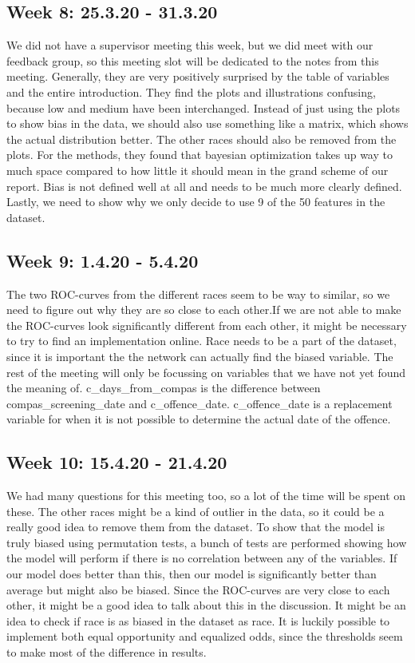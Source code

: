 \documentclass[11pt, fleqn]{article}
\begin{document}
\subsection*{Week 8: 25.3.20 - 31.3.20}
We did not have a supervisor meeting this week, but we did meet with our feedback group, so this meeting slot will be dedicated to the notes from this meeting. Generally, they are very positively surprised by the table of variables and the entire introduction. They find the plots and illustrations confusing, because low and medium have been interchanged. Instead of just using the plots to show bias in the data, we should also use something like a matrix, which shows the actual distribution better. The other races should also be removed from the plots. For the methods, they found that bayesian optimization takes up way to much space compared to how little it should mean in the grand scheme of our report. Bias is not defined well at all and needs to be much more clearly defined. Lastly, we need to show why we only decide to use 9 of the 50 features in the dataset.

\subsection*{Week 9: 1.4.20 - 5.4.20}
The two ROC-curves from the different races seem to be way to similar, so we need to figure out why they are so close to each other.If we are not able to make the ROC-curves look significantly different from each other, it might be necessary to try to find an implementation online. Race needs to be a part of the dataset, since it is important the the network can actually find the biased variable. The rest of the meeting will only be focussing on variables that we have not yet found the meaning of. c\_days\_from\_compas is the difference between compas\_screening\_date and c\_offence\_date. c\_offence\_date is a replacement variable for when it is not possible to determine the actual date of the offence.

\subsection*{Week 10: 15.4.20 - 21.4.20}
We had many questions for this meeting too, so a lot of the time will be spent on these. The other races might be a kind of outlier in the data, so it could be a really good idea to remove them from the dataset. To show that the model is truly biased using permutation tests, a bunch of tests are performed showing how the model will perform if there is no correlation between any of the variables. If our model does better than this, then our model is significantly better than average but might also be biased. Since the ROC-curves are very close to each other, it might be a good idea to talk about this in the discussion. It might be an idea to check if race is as biased in the dataset as race. It is luckily possible to implement both equal opportunity and equalized odds, since the thresholds seem to make most of the difference in results.
\end{document}
